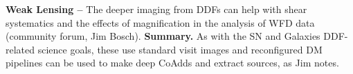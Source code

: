 \documentclass[DM,lsstdoc,toc]{lsstdoc}
\begin{document}
\noindent \textbf{Weak Lensing -- } The deeper imaging from DDFs can help with shear systematics and the effects of magnification in the analysis of WFD data (community forum, Jim Bosch). \textbf{Summary.} As with the SN and Galaxies DDF-related science goals, these use standard visit images and reconfigured DM pipelines can be used to make deep CoAdds and extract sources, as Jim notes.
\end{document}
